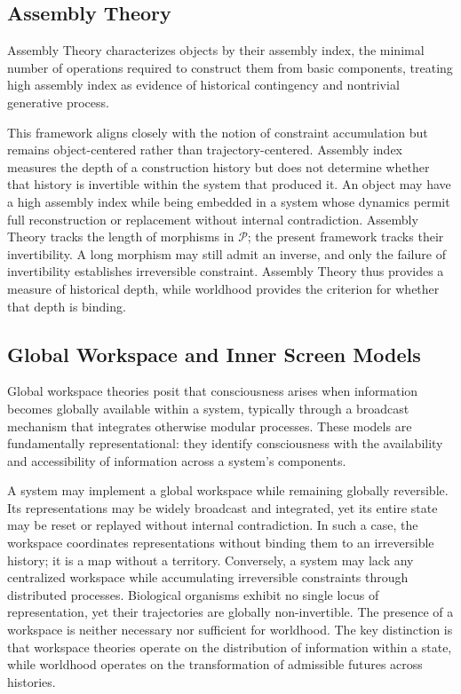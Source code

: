 \documentclass[11pt]{article}
\theoremstyle{definition}
\theoremstyle{remark}
\begin{document}
\subsection{Assembly Theory}

Assembly Theory characterizes objects by their assembly index, the minimal number of
operations required to construct them from basic components, treating high assembly
index as evidence of historical contingency and nontrivial generative process.

This framework aligns closely with the notion of constraint accumulation but remains
object-centered rather than trajectory-centered. Assembly index measures the depth of a
construction history but does not determine whether that history is invertible within the
system that produced it. An object may have a high assembly index while being embedded in
a system whose dynamics permit full reconstruction or replacement without internal
contradiction. Assembly Theory tracks the length of morphisms in $\mathcal{P}$; the
present framework tracks their invertibility. A long morphism may still admit an inverse,
and only the failure of invertibility establishes irreversible constraint. Assembly Theory
thus provides a measure of historical depth, while worldhood provides the criterion for
whether that depth is binding.

\subsection{Global Workspace and Inner Screen Models}

Global workspace theories posit that consciousness arises when information becomes globally
available within a system, typically through a broadcast mechanism that integrates otherwise
modular processes. These models are fundamentally representational: they identify
consciousness with the availability and accessibility of information across a system's
components.

A system may implement a global workspace while remaining globally reversible. Its
representations may be widely broadcast and integrated, yet its entire state may be reset
or replayed without internal contradiction. In such a case, the workspace coordinates
representations without binding them to an irreversible history; it is a map without a
territory. Conversely, a system may lack any centralized workspace while accumulating
irreversible constraints through distributed processes. Biological organisms exhibit no
single locus of representation, yet their trajectories are globally non-invertible.
The presence of a workspace is neither necessary nor sufficient for worldhood. The key
distinction is that workspace theories operate on the distribution of information within
a state, while worldhood operates on the transformation of admissible futures across
histories.
\end{document}
